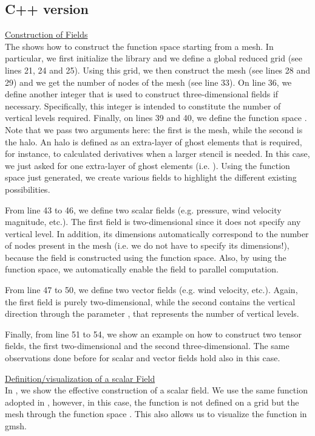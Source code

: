 \subsection{C++ version}
%
\begin{description}
%
\item \underline{Construction of Fields}\\[0.5em]
%
The  shows how to construct the function space 
 starting from a mesh. In particular, we first initialize 
the \Atlas library and we define a global reduced grid (see lines 
21, 24 and 25). Using this grid, we then construct the mesh (see 
lines 28 and 29) and we get the number of nodes of the mesh (see line 
33). On line 36, we define another integer that is used to construct 
three-dimensional fields if necessary. Specifically, this integer 
is intended to constitute the number of vertical levels required. 
Finally, on lines 39 and 40, we define the function space .
Note that we pass two arguments here: the first is the mesh, while the 
second is the halo. An halo is defined as an extra-layer of ghost elements
that is required, for instance, to calculated derivatives when a larger 
stencil is needed. In this case, we just asked for one extra-layer of 
ghost elements (i.e. ). 
Using the function space  just generated, we create 
various fields to highlight the different existing possibilities.

From line 43 to 46, we define two scalar fields (e.g. pressure, 
wind velocity magnitude, etc.). The first field is two-dimensional 
since it does not specify any vertical level. In addition, its 
dimensions automatically correspond to the number of nodes present 
in the mesh (i.e. we do not have to specify its dimensions!), because 
the field is constructed using the function space. Also, by using the 
function space, we automatically enable the field to parallel computation.

From line 47 to 50, we define two vector fields (e.g. wind velocity, etc.).
Again, the first field is purely two-dimensional, while the second contains 
the vertical direction through the parameter , that represents
the number of vertical levels. 

Finally, from line 51 to 54, we show an example on how to construct 
two tensor fields, the first two-dimensional and the second three-dimensional.
The same observations done before for scalar and vector fields hold 
also in this case.
%

%
%
\item \underline{Definition/visualization of a scalar Field}\\[0.5em]
%
%
In , we show the effective construction 
of a scalar field. We use the same function adopted in , 
however, in this case, the function is not defined on a grid but 
the mesh through the function space . This also allows 
us to visualize the function in gmsh.


\end{description}
